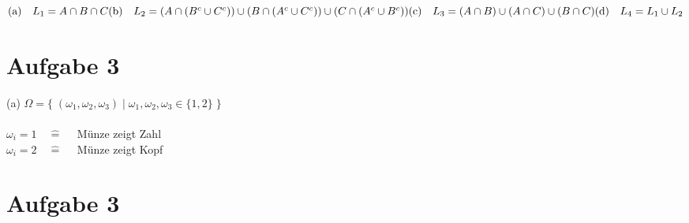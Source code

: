 \documentclass[10pt,a4paper]{article}
\begin{document}
		\begin{math}
			\text{(a)} \quad
			L_1 = A \cap B \cap C
			\\
			\\
			\text{(b)} \quad
			L_2 =
			(A \cap (B^c \cup C^c)) \cup
			(B \cap (A^c \cup C^c)) \cup
			(C \cap (A^c \cup B^c))
			\\
			\\
			\text{(c)} \quad
			L_3 =
			(A \cap B) \cup (A \cap C) \cup (B \cap C)
			\\
			\\
			\text{(d)} \quad
			L_4 = L_1 \cup L_2
		\end{math}

		\begin{flushright}
						\text{$\Box$}
		\end{flushright}

	\newpage

	\section*{Aufgabe 3}
		
		(a) \quad
		$\Omega = \{\; (\omega_1, \omega_2, \omega_3) \;|\; \omega_1, \omega_2, \omega_3 \in \{1, 2\} \;\}$
		\\
		\\
		$\omega_i = 1 \quad \mathrel{\hat{=}} \quad$ Münze zeigt Zahl 
		\\
		$\omega_i = 2 \quad \mathrel{\hat{=}} \quad$ Münze zeigt Kopf










	\section*{Aufgabe 3}
\end{document}

